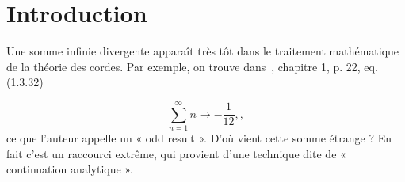 \section{Introduction}

Une somme infinie divergente apparaît très tôt dans le traitement mathématique de la théorie des cordes. Par exemple, on trouve dans~\cite{stringtheory98}, chapitre 1, p. 22, eq. (1.3.32)

\begin{equation}
\sum_{n=1}^{\infty} n \rightarrow -\frac{1}{12},\label{eq.zeta-1},
\end{equation}
ce que l'auteur appelle un « odd result ». D'où vient cette somme étrange ? En fait c'est un raccourci extrême, qui provient d'une technique dite de « continuation analytique ».